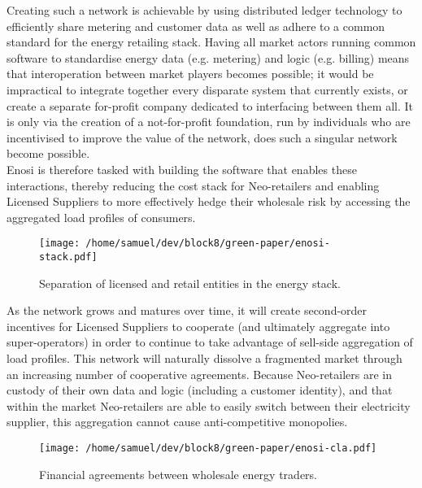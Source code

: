 \documentclass{article}
\theoremstyle{definition}
\theoremstyle{plain} %
\begin{document}
\noindent Creating such a network is achievable by using distributed ledger technology to efficiently share metering and customer data as well as adhere to a common standard for the energy retailing stack. Having all market actors running common software to standardise energy data (e.g. metering) and logic (e.g. billing) means that interoperation between market players becomes possible; it would be impractical to integrate together every disparate system that currently exists, or create a separate for-profit company dedicated to interfacing between them all. It is only via the creation of a not-for-profit foundation, run by individuals who are incentivised to improve the value of the network, does such a singular network become possible. \\

\noindent Enosi is therefore tasked with building the software that enables these interactions, thereby reducing the cost stack for Neo-retailers and enabling Licensed Suppliers to more effectively hedge their wholesale risk by accessing the aggregated load profiles of consumers. \\

\begin{figure}
\begin{center}
\texttt{[image: /home/samuel/dev/block8/green-paper/enosi-stack.pdf]}
\caption{Separation of licensed and retail entities in the energy stack.}
\end{center}
\end{figure}

\noindent As the network grows and matures over time, it will create second-order incentives for Licensed Suppliers to cooperate (and ultimately aggregate into super-operators) in order to continue to take advantage of sell-side aggregation of load profiles. This network will naturally dissolve a fragmented market through an increasing number of cooperative agreements. Because Neo-retailers are in custody of their own data and logic (including a customer identity), and that within the market Neo-retailers are able to easily switch between their electricity supplier, this aggregation cannot cause anti-competitive monopolies.

\begin{figure}
\begin{center}
\texttt{[image: /home/samuel/dev/block8/green-paper/enosi-cla.pdf]}
\caption{Financial agreements between wholesale energy traders.}	
\end{center}
\end{figure}
\end{document}
